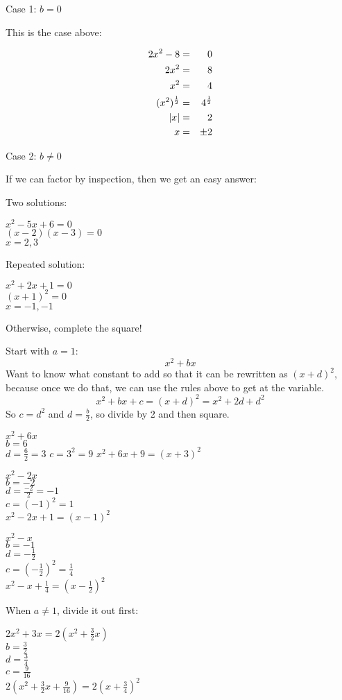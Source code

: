 \documentclass[letterpaper,12pt,fleqn]{article}
\begin{document}
Case 1: $b=0$

This is the case above:

\begin{eqnarray*}
  2x^2-8 &=& 0 \\
  2x^2 &=& 8 \\
  x^2 &=& 4 \\
  (x^2)^{\frac{1}{2}} &=& 4^{\frac{1}{2}} \\
  \lvert x\rvert &=& 2 \\
  x &=& \pm2 \\
\end{eqnarray*}

Case 2: $b\ne0$

If we can factor by inspection, then we get an easy answer:

Two solutions:

$x^2-5x+6=0$ \\
$(x-2)(x-3)=0$ \\
$x=2,3$

Repeated solution:

$x^2+2x+1=0$ \\
$(x+1)^2=0$ \\
$x=-1,-1$

Otherwise, complete the square!

Start with $a=1$:
\[x^2+bx\]
Want to know what constant to add so that it can be rewritten as $(x+d)^2$,
because once we do that, we can use the rules above to get at the variable.
\[x^2+bx+c=(x+d)^2=x^2+2d+d^2\]
So $c=d^2$ and $d=\frac{b}{2}$, so divide by 2 and then square.

\begin{example}
  $x^2+6x$ \\
  $b=6$ \\
  $d=\frac{6}{2}=3$
  $c=3^2=9$
  $x^2+6x+9=(x+3)^2$

  $x^2-2x$ \\
  $b=-2$ \\
  $d=\frac{-2}{2}=-1$ \\
  $c=(-1)^2=1$ \\
  $x^2-2x+1=(x-1)^2$

  $x^2-x$ \\
  $b=-1$ \\
  $d=-\frac{1}{2}$ \\
  $c=\left(-\frac{1}{2}\right)^2=\frac{1}{4}$ \\
  $x^2-x+\frac{1}{4}=\left(x-\frac{1}{2}\right)^2$
\end{example}

When $a\ne1$, divide it out first:
\begin{example}
  $2x^2+3x=2\left(x^2+\frac{3}{2}x\right)$ \\
  $b=\frac{3}{2}$ \\
  $d=\frac{3}{4}$ \\
  $c=\frac{9}{16}$ \\
  $2\left(x^2+\frac{3}{2}x+\frac{9}{16}\right)=2\left(x+\frac{3}{4}\right)^2$
\end{example}
\end{document}
